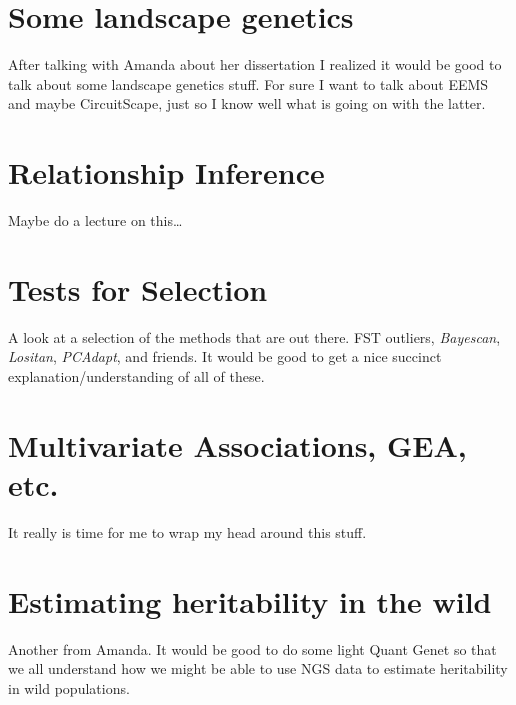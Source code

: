 \documentclass[]{krantz}
\begin{document}
\hypertarget{some-landscape-genetics}{%
\section{Some landscape genetics}\label{some-landscape-genetics}}

After talking with Amanda about her dissertation I realized it would be good
to talk about some landscape genetics stuff. For sure I want to talk about
EEMS and maybe CircuitScape, just so I know well what is going on with the
latter.

\hypertarget{relationship-inference}{%
\section{Relationship Inference}\label{relationship-inference}}

Maybe do a lecture on this\ldots{}

\hypertarget{tests-for-selection}{%
\section{Tests for Selection}\label{tests-for-selection}}

A look at a selection of the methods that are out there. FST outliers, \emph{Bayescan}, \emph{Lositan}, \emph{PCAdapt}, and friends. It would be good to get a nice succinct explanation/understanding of all of these.

\hypertarget{multivariate-associations-gea-etc.}{%
\section{Multivariate Associations, GEA, etc.}\label{multivariate-associations-gea-etc.}}

It really is time for me to wrap my head around this stuff.

\hypertarget{estimating-heritability-in-the-wild}{%
\section{Estimating heritability in the wild}\label{estimating-heritability-in-the-wild}}

Another from Amanda. It would be good to do some light Quant Genet so that
we all understand how we might be able to use NGS data to estimate heritability
in wild populations.



\backmatter
\printindex
\end{document}
